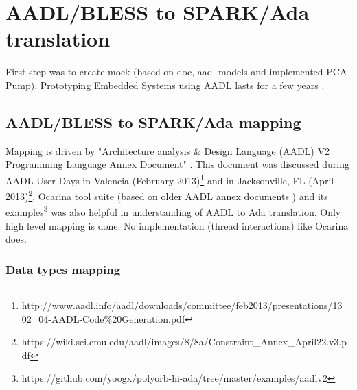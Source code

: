 
\cleardoublepage


\chapter{AADL/BLESS to SPARK/Ada translation}
\label{codegen}

First step was to create mock (based on doc, aadl models and implemented PCA Pump).
Prototyping Embedded Systems using AADL lasts for a few years \cite{PrototypyingAadl:Paper}.

\section{AADL/BLESS to SPARK/Ada mapping}
\label{codegen:mapping}



Mapping is driven by "Architecture analysis \& Design Language (AADL) V2 Programming Language Annex Document" \cite{AnnexDoc13}. This document was discussed during AADL User Days in Valencia (February 2013)\footnote{http://www.aadl.info/aadl/downloads/committee/feb2013/presentations/13\_02\_04-AADL-Code\%20Generation.pdf} and in Jacksonville, FL (April 2013)\footnote{https://wiki.sei.cmu.edu/aadl/images/8/8a/Constraint\_Annex\_April22.v3.pdf}. Ocarina tool suite (based on older AADL annex documents \cite{Ocarina:Article}) and its examples\footnote{https://github.com/yoogx/polyorb-hi-ada/tree/master/examples/aadlv2} was also helpful in understanding of AADL to Ada translation.
Only high level mapping is done. No implementation (thread interactions) like Ocarina does. 

\subsection{Data types mapping}
\label{codegen:mapping:data}


